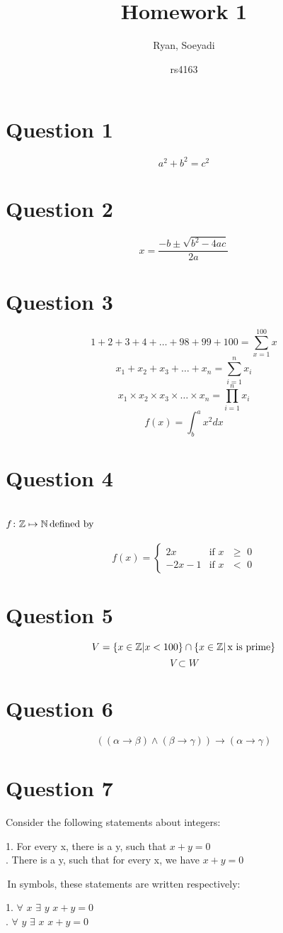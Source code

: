 \documentclass{article}
\title{Homework 1}
\author
{
Ryan, Soeyadi
\and rs4163
}
\newcommand{\Z}{\mathbb{Z}}
\newcommand{\N}{\mathbb{N}}
\begin{document}
    \maketitle
    
    \section*{Question 1}
    \[a^2+b^2=c^2\]
    \section*{Question 2}
    \[x= \frac{-b \pm \sqrt{b^2 - 4ac}}{2a}\]
    \section*{Question 3}
    \[1 + 2 + 3 + 4 + \dots + 98 + 99 + 100 = \sum_{x=1}^{100}{x}\]
    \[x_1 + x_2 + x_3 + \dots + x_n = \sum_{i=1}^{n}{x_i}\]
    \[x_1 \times x_2 \times x_3 \times\dots\times x_n = \prod_{i=1}^{n}{x_i}\]
    \[f(x) = \int^a_b x^2dx\]
    \section*{Question 4}
   \section*{
    $f\colon \Z \mapsto \N \textit{\normalfont \,defined by}$ 
    }
    \[
    	f(x) =
	\begin{cases}
					2x & \text{if $x$ $\geq$ 0} \\
					-2x - 1 & \text{if $x$ $<$ 0}
	\end{cases}
	\]
     
  
 
    \section*{Question 5}
    \[V = \{ x \in \Z | x < 100 \} \cap \{ x \in \Z | \text{\,x is prime} \} \] 
    \[V \subset W\]
     \section*{Question 6}
    \[((\alpha\rightarrow\beta) \land (\beta\rightarrow\gamma)) \rightarrow (\alpha\rightarrow\gamma)\]
    \section*{Question 7}
    Consider the following statements about integers: \\ \par
    1. For every x, there is a y, such that $x + y = 0$ \\ 
    . There is a y, such that for every x, we have $x + y = 0$ \\ \par
    \,In symbols, these statements are written respectively: \\ \par
    1. $\forall$ $x$ $\exists$ $y$ $x + y = 0$ \\ 
    . $\forall$ $y$ $\exists$ $x$ $x + y = 0$ \\ 
\end{document}
